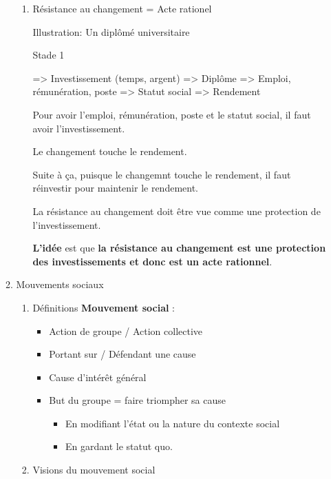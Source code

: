 \documentclass[11pt]{article}
\begin{document}
\begin{enumerate}
\begin{enumerate}
\begin{enumerate}
\item Résistance au changement = Acte rationel
\label{sec:org2a71110}

Illustration: Un diplômé universitaire 

Stade 1

=> Investissement (temps, argent)
   => Diplôme
      => Emploi, rémunération, poste
         => Statut social
=> Rendement

Pour avoir l'emploi, rémunération, poste et le statut social, il faut avoir
l'investissement.

Le changement touche le rendement.

Suite à ça, puisque le changemnt touche le rendement, il faut réinvestir pour
maintenir le rendement.

La résistance au changement doit être vue comme une protection de
l'investissement.

\textbf{L'idée} est que \textbf{la résistance au changement est une protection des
investissements et donc est un acte rationnel}.
\end{enumerate}


\item Mouvements sociaux
\label{sec:orga55972b}

\begin{enumerate}
\item Définitions
\label{sec:org6fab9b8}
\textbf{Mouvement social} :
\begin{itemize}
\item Action de groupe / Action collective
\item Portant sur / Défendant une cause
\item Cause d'intérêt général
\item But du groupe = faire triompher sa cause
\begin{itemize}
\item En modifiant l'état ou la nature du contexte social
\item En gardant le statut quo.
\end{itemize}
\end{itemize}

\item Visions du mouvement social
\label{sec:org6193fdb}


\end{enumerate}
\end{enumerate}
\end{enumerate}
\end{document}
